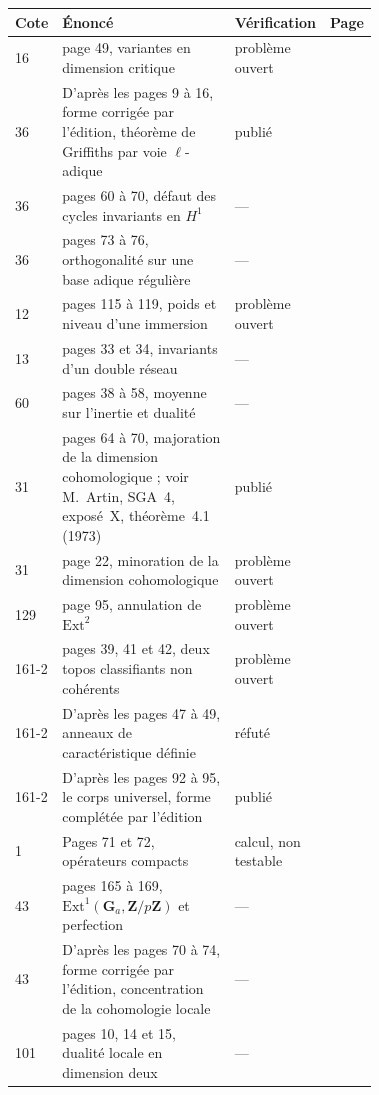 {\small
\begin{longtable}{@{}l>{\raggedright\arraybackslash}p{0.52\linewidth}>{\raggedright\arraybackslash}p{0.2\linewidth}r@{}}
\toprule
Cote & Énoncé & Vérification & Page\\
\midrule
\endhead
16 & page 49, variantes en dimension critique & problème ouvert & \pageref{nv:1}\\
36 & D'après les pages 9 à 16, forme corrigée par l'édition, théorème de Griffiths par voie $\ell$-adique & publié & \pageref{nv:2}\\
36 & pages 60 à 70, défaut des cycles invariants en $H^1$ & --- & \pageref{nv:3}\\
36 & pages 73 à 76, orthogonalité sur une base adique régulière & --- & \pageref{nv:4}\\
12 & pages 115 à 119, poids et niveau d'une immersion & problème ouvert & \pageref{nv:5}\\
13 & pages 33 et 34, invariants d'un double réseau & --- & \pageref{nv:6}\\
60 & pages 38 à 58, moyenne sur l'inertie et dualité & --- & \pageref{nv:7}\\
31 & pages 64 à 70, majoration de la dimension cohomologique ; voir M.~Artin, SGA~4, exposé~X, théorème~4.1 (1973) & publié & \pageref{nv:8}\\
31 & page 22, minoration de la dimension cohomologique & problème ouvert & \pageref{nv:9}\\
129 & page 95, annulation de $\mathrm{Ext}^2$ & problème ouvert & \pageref{nv:10}\\
161-2 & pages 39, 41 et 42, deux topos classifiants non cohérents & problème ouvert & \pageref{nv:11}\\
161-2 & D'après les pages 47 à 49, anneaux de caractéristique définie & réfuté & \pageref{nv:12}\\
161-2 & D'après les pages 92 à 95, le corps universel, forme complétée par l'édition & publié & \pageref{nv:13}\\
1 & Pages 71 et 72, opérateurs compacts & calcul, non testable & \pageref{nv:14}\\
43 & pages 165 à 169, $\mathrm{Ext}^1(\mathbf G_a, \mathbf Z/p\mathbf Z)$ et perfection & --- & \pageref{nv:15}\\
43 & D'après les pages 70 à 74, forme corrigée par l'édition, concentration de la cohomologie locale & --- & \pageref{nv:16}\\
101 & pages 10, 14 et 15, dualité locale en dimension deux & --- & \pageref{nv:17}\\

\end{longtable}}
